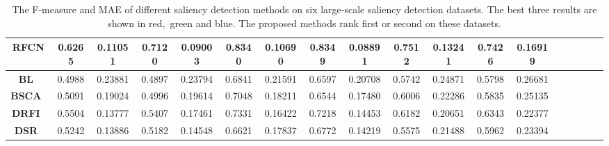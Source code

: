 \documentclass[10pt,twocolumn,letterpaper]{article}
\begin{document}
\begin{table*}
\begin{center}
\begin{tabular}{|c|c|c|c|c|c|c|c|c|c|c|c|c|c|c|c|c|c|c|c|c|c|c|c|c|||c|c|c|c|c|c|c|c|||}
\multicolumn{4}{|c|}{\textbf{RFCN}~\cite{wang2016saliency}}
&\multicolumn{2}{|c|}{0.6265}&\multicolumn{2}{|c|}{0.11051}&\multicolumn{2}{|c|}{0.7120}&\multicolumn{2}{|c|}{0.09003}&\multicolumn{2}{|c|}{0.8340}&\multicolumn{2}{|c|}{0.10690}&\multicolumn{2}{|c|}{0.8349}&\multicolumn{2}{|c|}{0.08891}&\multicolumn{2}{|c|}{0.7512}&\multicolumn{2}{|c|}{0.13241}&\multicolumn{2}{|c|}{0.7426}&\multicolumn{2}{|c|}{0.16919}\\
\hline
\multicolumn{4}{|c|}{\textbf{BL}~\cite{tong2015bootstrap}}
&\multicolumn{2}{|c|}{0.4988}&\multicolumn{2}{|c|}{0.23881}&\multicolumn{2}{|c|}{0.4897}&\multicolumn{2}{|c|}{0.23794}&\multicolumn{2}{|c|}{0.6841}&\multicolumn{2}{|c|}{0.21591}&\multicolumn{2}{|c|}{0.6597}&\multicolumn{2}{|c|}{0.20708}&\multicolumn{2}{|c|}{0.5742}&\multicolumn{2}{|c|}{0.24871}&\multicolumn{2}{|c|}{0.5798}&\multicolumn{2}{|c|}{0.26681}\\
\multicolumn{4}{|c|}{\textbf{BSCA}~\cite{qin2015saliency}}
&\multicolumn{2}{|c|}{0.5091}&\multicolumn{2}{|c|}{0.19024}&\multicolumn{2}{|c|}{0.4996}&\multicolumn{2}{|c|}{0.19614}&\multicolumn{2}{|c|}{0.7048}&\multicolumn{2}{|c|}{0.18211}&\multicolumn{2}{|c|}{0.6544}&\multicolumn{2}{|c|}{0.17480}&\multicolumn{2}{|c|}{0.6006}&\multicolumn{2}{|c|}{0.22286}&\multicolumn{2}{|c|}{0.5835}&\multicolumn{2}{|c|}{0.25135}\\
\multicolumn{4}{|c|}{\textbf{DRFI}~\cite{jiang2013salient}}
&\multicolumn{2}{|c|}{0.5504}&\multicolumn{2}{|c|}{0.13777}&\multicolumn{2}{|c|}{0.5407}&\multicolumn{2}{|c|}{0.17461}&\multicolumn{2}{|c|}{0.7331}&\multicolumn{2}{|c|}{0.16422}&\multicolumn{2}{|c|}{0.7218}&\multicolumn{2}{|c|}{0.14453}&\multicolumn{2}{|c|}{0.6182}&\multicolumn{2}{|c|}{0.20651}&\multicolumn{2}{|c|}{0.6343}&\multicolumn{2}{|c|}{0.22377}\\
\multicolumn{4}{|c|}{\textbf{DSR}~\cite{li2013saliency}}
&\multicolumn{2}{|c|}{0.5242}&\multicolumn{2}{|c|}{0.13886}&\multicolumn{2}{|c|}{0.5182}&\multicolumn{2}{|c|}{0.14548}&\multicolumn{2}{|c|}{0.6621}&\multicolumn{2}{|c|}{0.17837}&\multicolumn{2}{|c|}{0.6772}&\multicolumn{2}{|c|}{0.14219}&\multicolumn{2}{|c|}{0.5575}&\multicolumn{2}{|c|}{0.21488}&\multicolumn{2}{|c|}{0.5962}&\multicolumn{2}{|c|}{0.23394}\\
\hline
\end{tabular}
\vspace{1mm}
\caption{The F-measure and MAE of different saliency detection methods on six large-scale saliency detection datasets. The best three results are shown in \textcolor[rgb]{1,0,0}{red},~\textcolor[rgb]{0,1,0}{green} and \textcolor[rgb]{0,0,1}{blue}. The proposed methods rank first or second on these datasets.}
\vspace{-7mm}
\label{table:fauc}
\end{center}
\end{table*}
\end{document}

